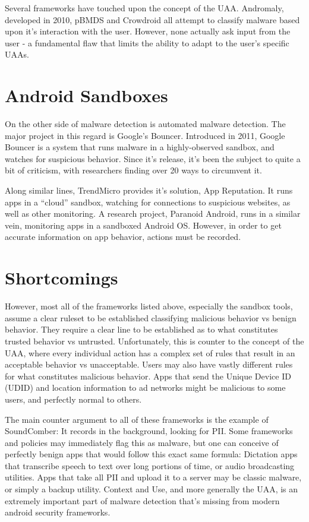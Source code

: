 Several frameworks have touched upon the concept of the UAA. Andromaly\citep{shabtai2012andromaly}, developed in 2010, pBMDS\citep{xie2010pbmds} and Crowdroid\citep{burguera2011crowdroid} all attempt to classify malware based upon it's interaction with the user. However, none actually ask input from the user - a fundamental flaw that limits the ability to adapt to the user's specific UAAs.

\section{Android Sandboxes}
On the other side of malware detection is automated malware detection. The major project in this regard is Google's Bouncer\citep{googlebouncer}. Introduced in 2011, Google Bouncer is a system that runs malware in a highly-observed sandbox, and watches for suspicious behavior. Since it's release, it's been the subject to quite a bit of criticism\citep{mansfield2012android}, with researchers finding over 20 ways to circumvent it.

Along similar lines, TrendMicro provides it's solution, App Reputation\citep{trendmicroappreputation}. It runs apps in a ``cloud'' sandbox, watching for connections to suspicious websites, as well as other monitoring. A research project, Paranoid Android\citep{portokalidis2010paranoid}, runs in a similar vein, monitoring apps in a sandboxed Android OS. However, in order to get accurate information on app behavior, actions must be recorded.

\section{Shortcomings}
However, most all of the frameworks listed above, especially the sandbox tools, assume a clear ruleset to be established classifying malicious behavior vs benign behavior. They require a clear line to be established as to what constitutes trusted behavior vs untrusted. Unfortunately, this is counter to the concept of the UAA, where every individual action has a complex set of rules that result in an acceptable behavior vs unacceptable. Users may also have vastly different rules for what constitutes malicious behavior. Apps that send the Unique Device ID (UDID) and location information to ad networks might be malicious to some users, and perfectly normal to others.

The main counter argument to all of these frameworks is the example of SoundComber: It records in the background, looking for PII. Some frameworks and policies may immediately flag this as malware, but one can conceive of perfectly benign apps that would follow this exact same formula: Dictation apps that transcribe speech to text over long portions of time, or audio broadcasting utilities. Apps that take all PII and upload it to a server may be classic malware, or simply a backup utility. Context and Use, and more generally the UAA, is an extremely important part of malware detection that's missing from modern android security frameworks.
